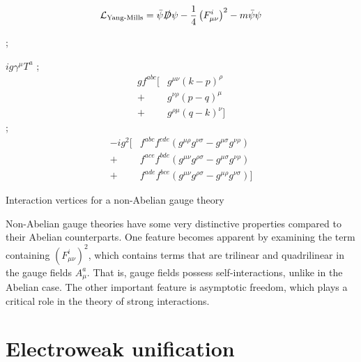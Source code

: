 $$\mathcal{L}_\text{Yang-Mills} = \bar{\psi}\slashed{D}\psi - \frac{1}{4}\left(F_{\mu\nu}^i\right)^2 - m\bar{\psi}\psi$$
\begin{marginfigure}[-3cm]
  ;

  $ig\gamma^\mu T^a$
\vskip 1cm
;
\begin{align*}
  gf^{abc}[&g^{\mu\nu}(k-p)^\rho\\
          +&g^{\nu\rho}(p-q)^\mu\\
          +&g^{\rho\mu}(q-k)^\nu]
\end{align*}
\vskip 1cm
;
\begin{align*}
 -ig^2[&f^{abc}f^{cde}(g^{\mu\rho}g^{\nu\sigma}-g^{\mu\sigma}g^{\nu\rho})\\
       +&f^{ace}f^{bde}(g^{\mu\nu}g^{\rho\sigma}-g^{\mu\sigma}g^{\nu\rho})\\
       +&f^{ade}f^{bce}(g^{\mu\nu}g^{\rho\sigma}-g^{\mu\rho}g^{\nu\sigma})]
\end{align*}
\caption{Interaction vertices for a non-Abelian gauge theory}
\end{marginfigure}
Non-Abelian gauge theories have some very distinctive properties compared to their Abelian counterparts. One feature becomes apparent by examining the term containing $(F_{\mu\nu}^i)^2$, which contains terms that are trilinear and quadrilinear in the gauge fields $A_\mu^a$. That is, gauge fields possess self-interactions, unlike in the Abelian case. The other important feature is asymptotic freedom, which plays a critical role in the theory of strong interactions. 

\section{Electroweak unification}

